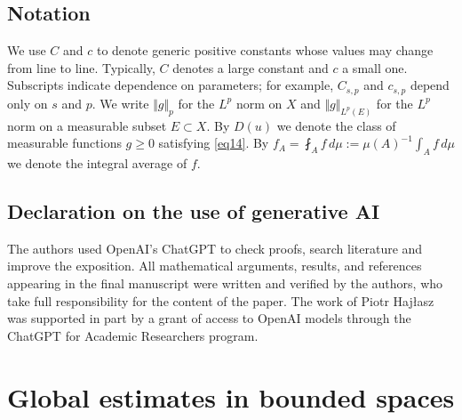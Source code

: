 \documentclass[12pt,leqno]{amsart}
\theoremstyle{definition}
\numberwithin{theorem}{section} \numberwithin{equation}{section}
\begin{document}
\subsection*{Notation}
We use $C$ and $c$ to denote generic positive constants whose values may change from line to line. Typically, $C$ denotes a large constant and $c$ a small one. Subscripts indicate dependence on parameters; for example, $C_{s,p}$ and $c_{s,p}$ depend only on $s$ and $p$. We write $\Vert g\Vert_p$ for the $L^p$ norm on $X$ and $\Vert g\Vert_{L^p(E)}$ for the $L^p$ norm on a measurable subset $E\subset X$.
By $D(u)$ we denote the class of measurable functions $g\geq 0$ satisfying \eqref{eq14}. 
By $f_A=\fint_A f\, d\mu:=\mu(A)^{-1}\int_A f\, d\mu$ we denote the integral average of $f$.


\subsection*{Declaration on the use of generative AI} 
The authors used OpenAI's ChatGPT to check proofs, search literature and improve the exposition. All mathematical arguments, results, and references appearing in the final manuscript were written and verified by the authors, who take full responsibility for the content of the paper.
The work of Piotr Hajłasz was supported in part by a grant of access to OpenAI models through the ChatGPT for Academic Researchers program.
\section{Global estimates in bounded spaces}
\end{document}
